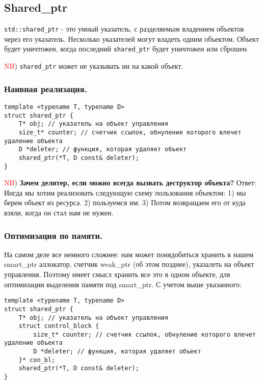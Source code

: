 \subsection{Shared\_ptr}
\texttt{std::shared_ptr} - это умный указатель, с разделяемым владением объектов через его указатель. Несколько указателей могут владеть одним объектом. Объект будет уничтожен, когда последний \texttt{shared_ptr} будет уничтожен или сброшен.

\textcolor{red}{NB}) \texttt{shared_ptr} может не указывать ни на какой объект.

\subsubsection{Наивная реализация.}

\begin{verbatim}
template <typename T, typename D>
struct shared_ptr {
    T* obj; // указатель на объект управления
    size_t* counter; // счетчик ссылок, обнуление которого влечет удаление объекта
    D *deleter; // функция, которая удаляет объект
    shared_ptr(*T, D const& deleter);
}

\end{verbatim}



\textcolor{red}{NB}) \textbf{Зачем делитер, если можно всегда вызвать деструктор объекта?} Ответ: Ингда мы хотим реализовать следующую схему пользования объектом: 1) мы берем объект из ресурса. 2) пользуемся им. 3) Потом возвращаем его от куда взяли, когда он стал нам не нужен.

\subsubsection{Оптимизация по памяти.}
На самом деле все немного сложнее: нам может понядобиться хранить в нашем smart\_ptr аллокатор, счетчик weak\_ptr (об этом позднее), указалеть на объект управления. Поэтому имеет смысл хранить все это в одном объекте, для оптимизации выделения памяти под smart\_ptr. С учетом выше указанного:

\begin{verbatim}
template <typename T, typename D>
struct shared_ptr {
    T* obj; // указатель на объект управления
    struct control_block {
        size_t* counter; // счетчик ссылок, обнуление которого влечет удаление объекта
        D *deleter; // функция, которая удаляет объект
    }* con_bl;
    shared_ptr(*T, D const& deleter);
}

\end{verbatim}



